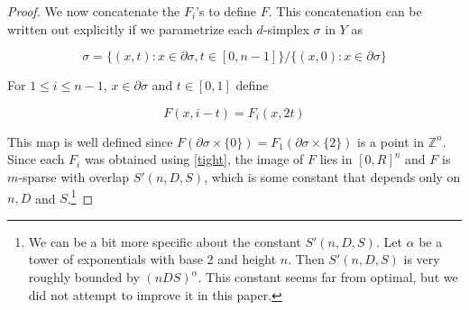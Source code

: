 \documentclass[10pt,a4paper]{amsart}
\newcommand{\ZZ}{\mathbb{Z}}
\begin{document}
\begin{proof}
		We now concatenate the $F_i$'s to define $F$. This concatenation can be written out explicitly if we parametrize each $d$-simplex $\sigma$ in $Y$ as
		
		$$\sigma = \{(x, t): x \in \partial \sigma, t \in [0, n-1]\}/ \{(x, 0): x \in \partial \sigma\}$$
		
		\noindent For $1 \le i \le n-1$, $x \in \partial \sigma$ and $t \in [0,1]$ define
		
		$$F(x, i - t) = F_i(x, 2t)$$
		
		\noindent This map is well defined since $F(\partial \sigma \times \{0\}) = F_{1}(\partial \sigma \times \{2\})$ is a point in $\ZZ^n$. Since each $F_i$ was obtained using \cref{tight}, the image of $F$ lies in $[0,R]^n$ and $F$ is $m$-sparse with overlap $S'(n,D,S)$, which is some constant that depends only on $n, D$ and $S$.\footnote{We can be a bit more specific about the constant $S'(n,D,S)$. Let $\alpha$ be a tower of exponentials with base 2 and height $n$. Then $S'(n,D,S)$ is very roughly bounded by $(nDS)^{\alpha}$. This constant seems far from optimal, but we did not attempt to improve it in this paper.}
	\end{proof}
\end{document}
